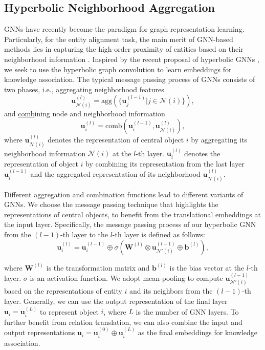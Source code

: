 \documentclass[11pt,a4paper]{article}
\begin{document}
\subsection{Hyperbolic Neighborhood Aggregation}
GNNs \cite{GCN} have recently become the paradigm for graph representation learning. Particularly, for the entity alignment task, the main merit of GNN-based methods lies in capturing the high-order proximity of entities based on their neighborhood information \cite{GCN_Align}. Inspired by the recent proposal of hyperbolic GNNs \cite{HGCN,HGCNN}, we seek to use the hyperbolic graph convolution to learn embeddings for knowledge association. The typical message passing process of GNNs consists of two phases, i.e., \underline{agg}regating neighborhood features
\begin{equation}
  \label{eq:aggregation}
  \mathbf{u}^{(l)}_{\mathcal{N}(i)} = \text{agg}(\{\mathbf{u}^{(l-1)}_{j} | j\in\mathcal{N}(i)\}),
\end{equation}
and \underline{comb}ining node and neighborhood information
\begin{equation}
  \label{eq:combination}
  \mathbf{u}^{(l)}_i = \text{comb}(\mathbf{u}^{(l-1)}_i,\mathbf{u}^{(l)}_{\mathcal{N}(i)}),
\end{equation}
where $\mathbf{u}^{(l)}_{\mathcal{N}(i)}$ denotes the representation of central object $i$ by aggregating its neighborhood information $\mathcal{N}(i)$ at the $l$-th layer. $\mathbf{u}^{(l)}_i$ denotes the representation of object $i$ by combining its representation from the last layer $\mathbf{u}^{(l-1)}_i$ and the aggregated representation of its neighborhood $\mathbf{u}^{(l)}_{\mathcal{N}(i)}$. 

Different aggregation and combination functions lead to different variants of GNNs. We choose the message passing technique that highlights the representations of central objects, to benefit from the translational embeddings at the input layer. Specifically, the message passing process of our hyperbolic GNN from the $(l-1)$-th layer to the $l$-th layer is defined as follows:
\begin{equation} 
	\label{eq:gcn}
	  \mathbf{u}^{(l)}_i = \mathbf{u}^{(l-1)}_i\oplus \sigma(\mathbf{W}^{(l)}\otimes\mathbf{u}^{(l-1)}_{\mathcal{N}'(i)}\oplus \mathbf{b}^{(l)}),
\end{equation}

\noindent
where $\mathbf{W}^{(l)}$ is the transformation matrix and $\mathbf{b}^{(l)}$ is the bias vector at the $l$-th layer. $\sigma$ is an activation function. We adopt mean-pooling to compute $\mathbf{u}^{(l-1)}_{\mathcal{N}'(i)}$ based on the representations of entity $i$ and its neighbors from the $(l-1)$-th layer. Generally, we can use the output representation of the final layer $\mathbf{u}_i=\mathbf{u}_i^{(L)}$ to represent object $i$, where $L$ is the number of GNN layers. To further benefit from relation translation, we can also combine the input and output representations $\mathbf{u}_i=\mathbf{u}_i^{(0)}\oplus\mathbf{u}_i^{(L)}$ as the final embeddings for knowledge association.
\end{document}
